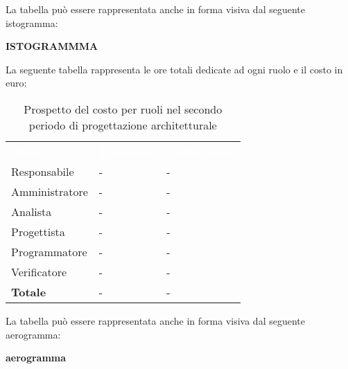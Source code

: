 La tabella può essere rappresentata anche in forma visiva dal seguente istogramma:

\textbf{ISTOGRAMMMA}


La seguente tabella rappresenta le ore totali dedicate ad ogni ruolo e il costo in euro:

\begin{table}[!htbp]
\begin{center}
\renewcommand{\arraystretch}{1.5}
\begin{tabular}{ m{}<{\centering}  m{}<{\centering} m{}<{\centering}}
	\rowcolor{darkblue}
	\textcolor{white}{\textbf{Ruolo}}&\textcolor{white}{\textbf{Totale ore}}&\textcolor{white}{\textbf{Costo totale}}\\ 

	Responsabile  & - & - \\	

	\rowcolor{gray!10} Amministratore & - & - \\
	
	Analista & - & - \\
	
	\rowcolor{gray!10} Progettista & - & - \\
	
	Programmatore & - & - \\
	
	\rowcolor{gray!10} Verificatore & - & - \\
	
	\textbf{Totale} & - & - \\
	
\end{tabular}
\caption{Prospetto del costo per ruoli nel secondo periodo di progettazione architetturale}
\end{center}
\end{table}

La tabella può essere rappresentata anche in forma visiva dal seguente aerogramma:

\textbf{aerogramma}


